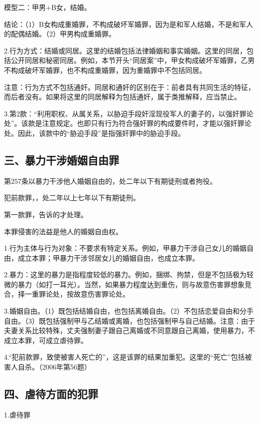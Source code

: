 模型二：甲男+B女，结婚。

结论：（1）B女构成重婚罪，不构成破坏军婚罪，因为是和军人结婚，不是和军人的配偶结婚。（2）甲男构成重婚罪。

2.行为方式：结婚或同居。这里的结婚包括法律婚姻和事实婚姻。这里的同居，包括公开同居和秘密同居。例如，本节开头“同居案”中，甲女构成破坏军婚罪，乙男不构成破坏军婚罪，也不构成重婚罪，因为重婚罪中不包括同居。

注意：行为方式不包括通奸。同居和通奸的区别在于：前者具有共同生活的特征，而后者没有。如果将这里的同居解释为包括通奸，属于类推解释，应当禁止。

3.第2款：“利用职权、从属关系，以胁迫手段奸淫现役军人的妻子的，以强奸罪论处”。该款是注意规定。也即只有行为符合强奸罪的构成要件时，才能以强奸罪论处。因此，该款中的“胁迫手段”是指强奸罪中的胁迫手段。

\subsection*{三、暴力干涉婚姻自由罪}

第257条以暴力干涉他人婚姻自由的，处二年以下有期徒刑或者拘役。

犯前款罪，，处二年以上七年以下有期徒刑。

第一款罪，告诉的才处理。

本罪侵害的法益是他人的婚姻自由权。

1.行为主体与行为对象：不要求有特定关系。例如，甲暴力干涉自己女儿的婚姻自由，成立本罪；甲暴力干涉邻居女儿的婚姻自由，也成立本罪。

2.暴力：这里的暴力是指程度较低的暴力。例如，捆绑、拘禁，但是不包括极为轻微的暴力（如打一耳光）。当然，如果暴力程度达到重伤，则与故意伤害罪想象竞合，择一重罪论处，按故意伤害罪论处。

3.婚姻自由。（1）既包括结婚自由，也包括离婚自由。（2）不包括恋爱自由和分手自由。（3）既包括强制甲与乙结婚或离婚，也包括强制甲与自己结婚。注意：由于夫妻关系比较特殊，丈夫强制妻子跟自己离婚或不同意跟自己离婚，使用暴力，不成立本罪，可成立虐待罪。

4.“犯前款罪，致使被害人死亡的”，这是该罪的结果加重犯。这里的“死亡”包括被害人自杀。（2006年第56题）

\subsection*{四、虐待方面的犯罪}

1.虐待罪

